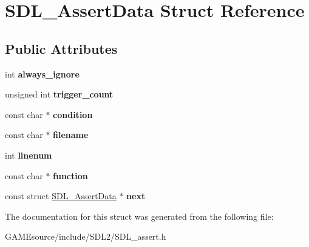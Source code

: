 \hypertarget{struct_s_d_l___assert_data}{}\section{S\+D\+L\+\_\+\+Assert\+Data Struct Reference}
\label{struct_s_d_l___assert_data}
\subsection*{Public Attributes}
\begin{DoxyCompactItemize}
\item 
\mbox{\label{struct_s_d_l___assert_data_a825e1c7772fe24afad33d0afc42cf04c}} 
int {\bfseries always\+\_\+ignore}
\item 
\mbox{\label{struct_s_d_l___assert_data_a230bbcc2d115aab04cf817773e08eb5b}} 
unsigned int {\bfseries trigger\+\_\+count}
\item 
\mbox{\label{struct_s_d_l___assert_data_aec6d372462fa8c94a9d04c1168cd38c9}} 
const char $\ast$ {\bfseries condition}
\item 
\mbox{\label{struct_s_d_l___assert_data_acf27f593e6a436386d2cbcf826cf1ef7}} 
const char $\ast$ {\bfseries filename}
\item 
\mbox{\label{struct_s_d_l___assert_data_ad026d8573970d2402230d5fa3c550b0f}} 
int {\bfseries linenum}
\item 
\mbox{\label{struct_s_d_l___assert_data_a4913c57d4affb813feea82fc5f48a25c}} 
const char $\ast$ {\bfseries function}
\item 
\mbox{\label{struct_s_d_l___assert_data_a2081dcf06dce4df497e423bccddfc099}} 
const struct \mbox{\hyperlink{struct_s_d_l___assert_data}{S\+D\+L\+\_\+\+Assert\+Data}} $\ast$ {\bfseries next}
\end{DoxyCompactItemize}


The documentation for this struct was generated from the following file\+:\begin{DoxyCompactItemize}
\item 
G\+A\+M\+Esource/include/\+S\+D\+L2/S\+D\+L\+\_\+assert.\+h\end{DoxyCompactItemize}

